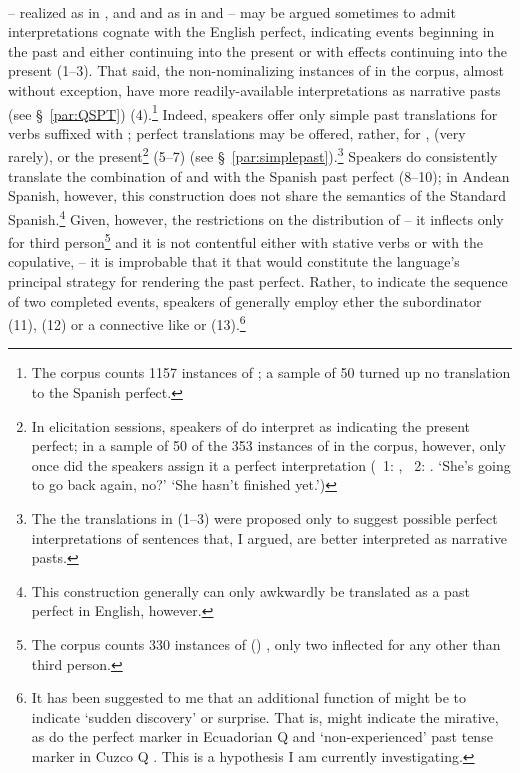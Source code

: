 \paragraph{}\label{par:perfect}
 -- realized as  in \ACH, \AMV{} and \SP{} and as  in \CH{} and \LT{} -- may be argued sometimes to admit interpretations cognate with the English perfect, indicating events beginning in the past and either continuing into the present or with effects continuing into the present (1--3). That said, the non-nominalizing instances of  in the corpus, almost without exception, have more readily-available interpretations as narrative pasts (see \S~\ref{par:QSPT}) (4).\footnote{The corpus counts 1157 instances of ; a sample of 50 turned up no translation to the Spanish perfect.} Indeed, speakers offer only simple past translations for verbs suffixed with ; perfect translations may be offered, rather, for ,  (very rarely), or the present\footnote{In elicitation sessions, speakers of \SYQ{} do interpret  as indicating the present perfect; in a sample of 50 of the 353 instances of  in the corpus, however, only once did the speakers assign it a perfect interpretation (\spkr~1:  ,  \spkr~2:  . `She's going to go back again, no?' `She hasn't finished yet.')} (5--7) (see \S~\ref{par:simplepast}).\footnote{The the translations in (1--3) were proposed only to suggest possible perfect interpretations of sentences that, I argued, are better interpreted as narrative pasts.} Speakers do consistently translate the combination of  and  with the Spanish past perfect (8--10); in Andean Spanish, however, this construction does not share the semantics of the Standard Spanish.\footnote{This construction generally can only awkwardly be translated as a past perfect in English, however.} Given, however, the restrictions on the distribution of  -- it inflects only for third person\footnote{The corpus counts 330 instances of  () , only two inflected for any other than third person.} and it is not contentful either with stative verbs or with the copulative,  -- it is improbable that it that would constitute the language's principal strategy for rendering the past perfect. Rather, to indicate the sequence of two completed events, speakers of \SYQ{} generally employ ether the subordinator  (11), (12) or a connective like  or  (13).\footnote{It has been suggested to me that an additional function of  might be to indicate `sudden discovery' \citep{Adelaar77} or surprise. That is,  might indicate the mirative, as do the perfect marker  in Ecuadorian Q \citep{muysken1977syntactic} and `non-experienced' past tense marker  in Cuzco Q \citep{Faller03} \citep[as cited in][223--33]{Peterson14}. This is a hypothesis I am currently investigating.} 

